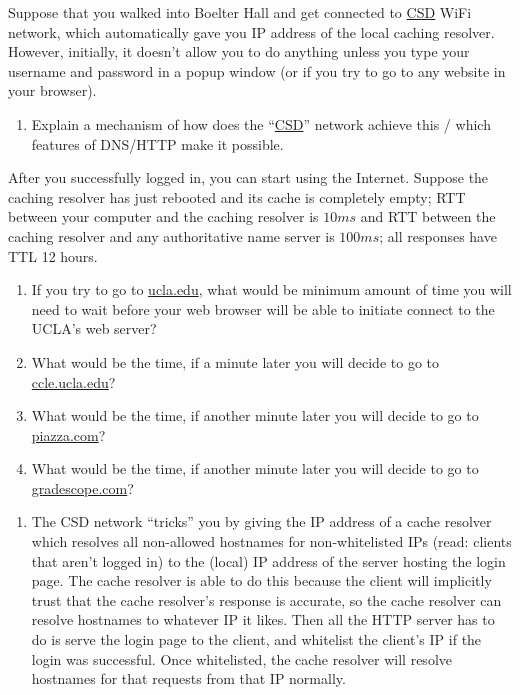 \documentclass{report}
\begin{document}
\clearpage
\begin{problem}

Suppose that you walked into Boelter Hall and get connected to \url{CSD} WiFi
network, which automatically gave you IP address of the local caching resolver.
However, initially, it doesn't allow you to do anything unless you type your
username and password in a popup window (or if you try to go to any website in
your browser).

\begin{enumerate}

\item Explain a mechanism of how does the ``\url{CSD}'' network achieve this /
      which features of DNS/HTTP make it possible.

\end{enumerate}

After you successfully logged in, you can start using the Internet. Suppose
the caching resolver has just rebooted and its cache is completely empty; RTT
between your computer and the caching resolver is $10 ms$ and RTT between the
caching resolver and any authoritative name server is $100 ms$; all responses
have TTL 12 hours.

\begin{enumerate}\addtocounter{enumi}{1}
\item If you try to go to \url{ucla.edu}, what would be minimum amount of time
  you will need to wait before your web browser will be able to initiate
  connect to the UCLA's web server?

\item What would be the time, if a minute later you will decide to go to
      \url{ccle.ucla.edu}?

\item What would be the time, if another minute later you will decide to go to
      \url{piazza.com}?

\item What would be the time, if another minute later you will decide to go to
      \url{gradescope.com}?

\end{enumerate}

\begin{answer}{30em}
  \begin{enumerate}
  \item The CSD network ``tricks'' you by giving the IP address of a cache
        resolver which resolves all non-allowed hostnames for non-whitelisted IPs
        (read: clients that aren't logged in) to the (local) IP address of the
        server hosting the login page. The cache resolver is able to do this
        because the client will implicitly trust that the cache resolver's
        response is accurate, so the cache resolver can resolve hostnames to
        whatever IP it likes. Then all the HTTP server has to do is serve the
        login page to the client, and whitelist the client's IP if the login
        was successful. Once whitelisted, the cache resolver will resolve
        hostnames for that requests from that IP normally.


\end{enumerate}
\end{answer}
\end{problem}
\end{document}
